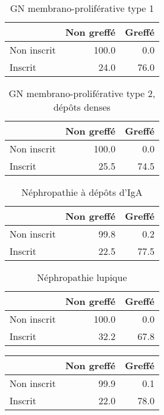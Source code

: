 \documentclass[11pt,a4paper]{article}\usepackage[]{graphicx}\usepackage[]{color}
\begin{document}
\begin{multicols}{2}
\begin{table}[H]
\begin{tabular}{lrr}
  \hline
 & Non greffé & Greffé \\ 
  \hline
Non inscrit & 100.0 & 0.0 \\ 
  Inscrit & 24.0 & 76.0 \\ 
   \hline
\end{tabular}
\caption{GN membrano-proliférative type 1} 
\end{table}
\begin{table}[H]
\centering
\begin{tabular}{lrr}
  \hline
 & Non greffé & Greffé \\ 
  \hline
Non inscrit & 100.0 & 0.0 \\ 
  Inscrit & 25.5 & 74.5 \\ 
   \hline
\end{tabular}
\caption{GN membrano-proliférative type 2, dépôts denses} 
\end{table}
\begin{table}[H]
\centering
\begin{tabular}{lrr}
  \hline
 & Non greffé & Greffé \\ 
  \hline
Non inscrit & 99.8 & 0.2 \\ 
  Inscrit & 22.5 & 77.5 \\ 
   \hline
\end{tabular}
\caption{Néphropathie à dépôts d'IgA} 
\end{table}
\begin{table}[H]
\centering
\begin{tabular}{lrr}
  \hline
 & Non greffé & Greffé \\ 
  \hline
Non inscrit & 100.0 & 0.0 \\ 
  Inscrit & 32.2 & 67.8 \\ 
   \hline
\end{tabular}
\caption{Néphropathie lupique} 
\end{table}
\begin{table}[H]
\centering
\begin{tabular}{lrr}
  \hline
 & Non greffé & Greffé \\ 
  \hline
Non inscrit & 99.9 & 0.1 \\ 
  Inscrit & 22.0 & 78.0 \\ 

\end{tabular}
\end{table}
\end{multicols}
\end{document}

